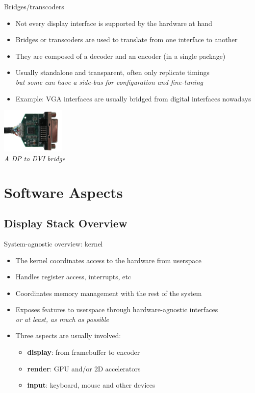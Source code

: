\begin{frame}{Bridges/transcoders}
  \begin{itemize}
  \item Not every display interface is supported by the hardware at hand
  \item Bridges or transcoders are used to translate from one interface to another
  \item They are composed of a decoder and an encoder (in a single package)
  \item Usually standalone and transparent, often only replicate timings\\
  \textit{but some can have a side-bus for configuration and fine-tuning}
  \item Example: VGA interfaces are usually bridged from digital interfaces nowadays
  \end{itemize}

  \begin{center}
  \includegraphics[height=6em]{slides/graphics-introduction/dp-dvi-bridge.jpg}\\
  \textit{\small A DP to DVI bridge}
  \end{center}
\end{frame}

\section{Software Aspects}

\subsection{Display Stack Overview}

\begin{frame}{System-agnostic overview: kernel}
  \begin{itemize}
  \item The kernel coordinates access to the hardware from userspace
  \item Handles register access, interrupts, etc
  \item Coordinates memory management with the rest of the system
  \item Exposes features to userspace through hardware-agnostic interfaces\\
  \textit{or at least, as much as possible}
  \item Three aspects are usually involved:
    \begin{itemize}
    \item \textbf{display}: from framebuffer to encoder
    \item \textbf{render}: GPU and/or 2D accelerators
    \item \textbf{input}: keyboard, mouse and other devices
    \end{itemize}
  \end{itemize}
\end{frame}

